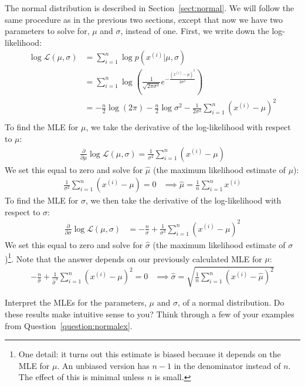 The normal distribution is described in Section~\ref{sect:normal}. We will follow the same procedure as in the previous two sections, except that now we have two parameters to solve for, $\mu$ and $\sigma$, instead of one. First, we write down the log-likelihood:
\begin{align*}
\log \mathcal{L}(\mu, \sigma) &= \sum_{i=1}^n \log p(x^{(i)}|\mu, \sigma) \\
&= \sum_{i=1}^n \log \left( \frac{1}{\sqrt{2 \pi \sigma^2}} e^{-\frac{(x^{(i)}-\mu)^2}{2 \sigma^2}} \right) \\
&= -\frac{n}{2} \log (2 \pi) - \frac{n}{2} \log \sigma^2 - \frac{1}{2 \sigma^2} \sum_{i=1}^n \left( x^{(i)} - \mu \right)^2 \\
\end{align*}
To find the MLE for $\mu$, we take the derivative of the log-likelihood with respect to $\mu$:
\begin{align*}
\frac{\partial}{\partial \mu} \log \mathcal{L}(\mu, \sigma) = \frac{1}{\sigma^2} \sum_{i=1}^n \left( x^{(i)} - \mu \right)
\end{align*}
We set this equal to zero and solve for $\hat{\mu}$ (the maximum likelihood estimate of $\mu$):
\begin{align*} \frac{1}{\sigma^2} \sum_{i=1}^n \left( x^{(i)} - \mu \right) = 0 & \implies \boxed{\hat{\mu} = \frac{1}{n} \sum_{i=1}^n x^{(i)}} \end{align*}
To find the MLE for $\sigma$, we then take the derivative of the log-likelihood with respect to $\sigma$:
\begin{align*} \frac{\partial}{\partial \sigma} \log \mathcal{L}(\mu, \sigma) &= -\frac{n}{\sigma} + \frac{1}{\sigma^3} \sum_{i=1}^n \left( x^{(i)} - \mu \right)^2
\end{align*}
We set this equal to zero and solve for $\hat{\sigma}$ (the maximum likelihood estimate of $\sigma$)\footnote{One detail: it turns out this estimate is biased because it depends on the MLE for $\mu$. An unbiased version has $n-1$ in the denominator instead of $n$. The effect of this is minimal unless $n$ is small.}. Note that the answer depends on our previously calculated MLE for $\mu$:
\begin{align*}
-\frac{n}{\hat{\sigma}} + \frac{1}{\hat{\sigma}^3} \sum_{i=1}^n \left( x^{(i)} - \mu \right)^2 = 0  & \implies \boxed{\hat{\sigma} = \sqrt{\frac{1}{n} \sum_{i=1}^n \left( x^{(i)} - \hat{\mu} \right)^2}}
\end{align*}

\begin{question}{}
Interpret the MLEs for the parameters, $\mu$ and $\sigma$, of a normal distribution. Do these results make intuitive sense to you? Think through a few of your examples from Question~\ref{question:normalex}. 
\end{question}

